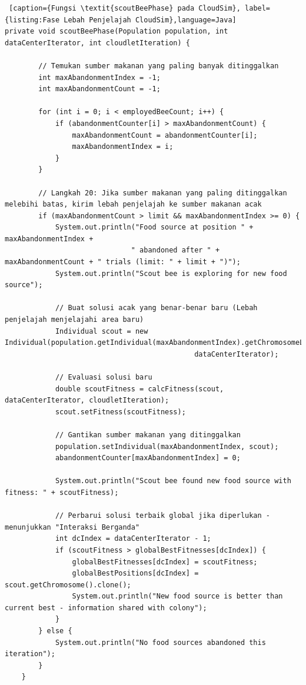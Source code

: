 \begin{lstlisting} [caption={Fungsi \textit{scoutBeePhase} pada CloudSim}, label={listing:Fase Lebah Penjelajah CloudSim},language=Java]
private void scoutBeePhase(Population population, int dataCenterIterator, int cloudletIteration) {
        
        // Temukan sumber makanan yang paling banyak ditinggalkan
        int maxAbandonmentIndex = -1;
        int maxAbandonmentCount = -1;
        
        for (int i = 0; i < employedBeeCount; i++) {
            if (abandonmentCounter[i] > maxAbandonmentCount) {
                maxAbandonmentCount = abandonmentCounter[i];
                maxAbandonmentIndex = i;
            }
        }
        
        // Langkah 20: Jika sumber makanan yang paling ditinggalkan melebihi batas, kirim lebah penjelajah ke sumber makanan acak
        if (maxAbandonmentCount > limit && maxAbandonmentIndex >= 0) {
            System.out.println("Food source at position " + maxAbandonmentIndex + 
                              " abandoned after " + maxAbandonmentCount + " trials (limit: " + limit + ")");
            System.out.println("Scout bee is exploring for new food source");
            
            // Buat solusi acak yang benar-benar baru (Lebah penjelajah menjelajahi area baru)
            Individual scout = new Individual(population.getIndividual(maxAbandonmentIndex).getChromosomeLength(), 
                                             dataCenterIterator);
            
            // Evaluasi solusi baru
            double scoutFitness = calcFitness(scout, dataCenterIterator, cloudletIteration);
            scout.setFitness(scoutFitness);
            
            // Gantikan sumber makanan yang ditinggalkan
            population.setIndividual(maxAbandonmentIndex, scout);
            abandonmentCounter[maxAbandonmentIndex] = 0;
            
            System.out.println("Scout bee found new food source with fitness: " + scoutFitness);
            
            // Perbarui solusi terbaik global jika diperlukan - menunjukkan "Interaksi Berganda"
            int dcIndex = dataCenterIterator - 1;
            if (scoutFitness > globalBestFitnesses[dcIndex]) {
                globalBestFitnesses[dcIndex] = scoutFitness;
                globalBestPositions[dcIndex] = scout.getChromosome().clone();
                System.out.println("New food source is better than current best - information shared with colony");
            }
        } else {
            System.out.println("No food sources abandoned this iteration");
        }
    }
\end{lstlisting}

